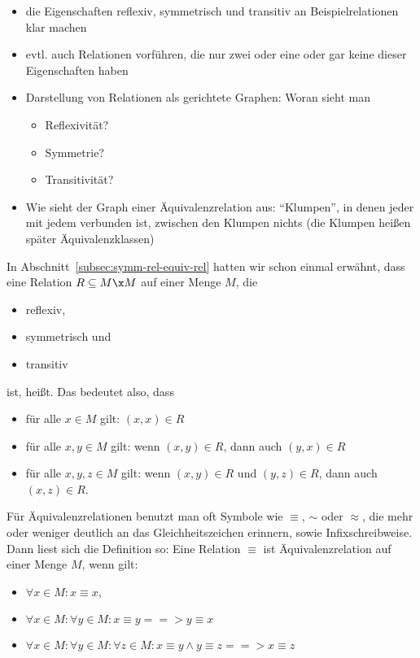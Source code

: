 \begin{tutorium}
  \begin{itemize}
  \item die Eigenschaften reflexiv, symmetrisch und transitiv an
    Beispielrelationen klar machen
  \item evtl. auch Relationen vorführen, die nur zwei oder eine oder
    gar keine dieser Eigenschaften haben
  \item Darstellung von Relationen als gerichtete Graphen:
    Woran sieht man
    \begin{itemize}
    \item Reflexivität?
    \item Symmetrie?
    \item Transitivität?
    \end{itemize}
  \item Wie sieht der Graph einer Äquivalenzrelation aus:
    "`Klumpen"', in denen jeder mit jedem verbunden ist, zwischen
    den Klumpen nichts (die Klumpen heißen später Äquivalenzklassen)
  \end{itemize}
\end{tutorium}
In Abschnitt~\ref{subsec:symm-rel-equiv-rel} hatten wir schon einmal
erwähnt, dass eine Relation $R\subseteq M\x M$ auf einer Menge $M$,
die
\begin{itemize}
\item reflexiv,
\item symmetrisch und
\item transitiv
\end{itemize}
ist,  heißt.
Das bedeutet also, dass
\begin{itemize}
\item für alle $x\in M$ gilt: $(x,x)\in R$
\item für alle $x,y\in M$ gilt: wenn $(x,y)\in R$, dann auch $(y,x)\in R$
\item für alle $x,y,z\in M$ gilt: wenn $(x,y)\in R$ und $(y,z)\in R$,
  dann auch $(x,z)\in R$.
\end{itemize}
%
Für Äquivalenzrelationen benutzt man oft Symbole wie $\equiv$, $\sim$
oder $\approx$, die mehr oder weniger deutlich an das
Gleichheitszeichen erinnern, sowie Infixschreibweise. Dann liest sich
die Definition so: Eine Relation $\equiv$ ist Äquivalenzrelation auf
einer Menge $M$, wenn gilt:
\begin{itemize}
\item $\forall x\in M: x \equiv x$,
\item $\forall x\in M: \forall y\in M: x\equiv y ==> y \equiv x$
\item $\forall x\in M: \forall y\in M: \forall z\in M: x\equiv y \land
  y\equiv z ==> x \equiv z$
\end{itemize}
